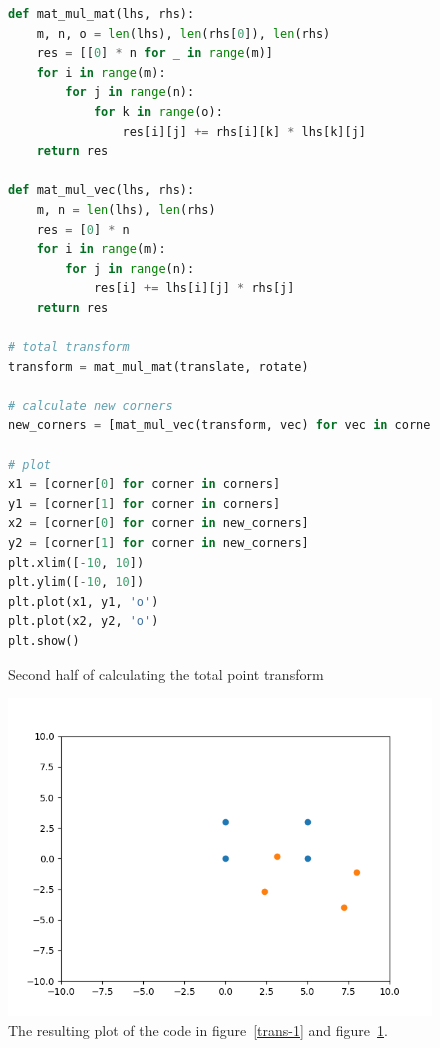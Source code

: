 \documentclass[a4paper, titlepage,12pt]{article}
\begin{document}
	\begin{figure}[H]
	\begin{center}
	\begin{lstlisting}[language=Python]
def mat_mul_mat(lhs, rhs):
    m, n, o = len(lhs), len(rhs[0]), len(rhs)
    res = [[0] * n for _ in range(m)]
    for i in range(m):
        for j in range(n):
            for k in range(o):
                res[i][j] += rhs[i][k] * lhs[k][j]
    return res

def mat_mul_vec(lhs, rhs):
    m, n = len(lhs), len(rhs)
    res = [0] * n
    for i in range(m):
        for j in range(n):
            res[i] += lhs[i][j] * rhs[j]
    return res

# total transform
transform = mat_mul_mat(translate, rotate)

# calculate new corners
new_corners = [mat_mul_vec(transform, vec) for vec in corners]

# plot
x1 = [corner[0] for corner in corners]
y1 = [corner[1] for corner in corners]
x2 = [corner[0] for corner in new_corners]
y2 = [corner[1] for corner in new_corners]
plt.xlim([-10, 10])
plt.ylim([-10, 10])
plt.plot(x1, y1, 'o')
plt.plot(x2, y2, 'o')
plt.show()
	\end{lstlisting}
	\caption{Second half of calculating the total point transform}
	\label{trans-2}
	\end{center}
	\end{figure}

	\begin{figure}[H]
		\begin{center}
		\includegraphics[scale=0.8]{./transform1.png}
			\caption{The resulting plot of the code in figure~\ref{trans-1} and figure~\ref{trans-2}.}
		\end{center}
	\end{figure}
\end{document}
